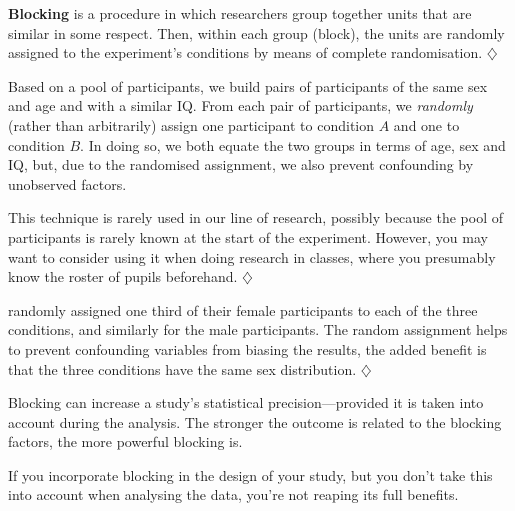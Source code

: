 \documentclass[a4paper]{tufte-book}\usepackage[]{graphicx}\usepackage[]{xcolor}
\newcommand{\term}[1]{\textbf{#1}}
\newcommand*{\parend}[1][$\diamondsuit$]{%
  \unskip\nobreak\hspace{1em plus 1fill}$\diamondsuit$%
}
\begin{document}
  \term{Blocking} is a procedure in which researchers group together units
  that are similar in some respect.
  Then, within each group (block), the units are randomly assigned to
  the experiment's conditions by means of complete randomisation.
\parend



Based on a pool of participants, we build pairs of participants of the same sex and age and
with a similar IQ. 
From each pair of participants, we \emph{randomly}
(rather than arbitrarily) assign one participant to condition $A$ and
one to condition $B$. In doing so, we both equate the two groups
in terms of age, sex and IQ, but, due to the randomised assignment,
we also prevent confounding by
unobserved factors.

This technique is rarely used in our line of research, possibly because the pool of participants is rarely known at the start of the experiment.
However, you may want to consider using it 
when doing research in classes, where you presumably know the roster of pupils
beforehand.
\parend

\label{ex:ludkeblocking}
  \citet{Ludke2014} randomly assigned one third of their female participants
  to each of the three conditions, and similarly for the male participants.
  The random assignment helps to prevent
  confounding variables from biasing the results, 
  the added benefit is that the three conditions have the same sex distribution.
\parend

Blocking can increase a study's statistical precision---provided it is
taken into account during the analysis.
The stronger the outcome is related to the
blocking factors, the more powerful blocking is.

If you incorporate blocking in the design of your study, 
but you don't take this into account when analysing the data,
you're not reaping its full benefits.
\end{document}
